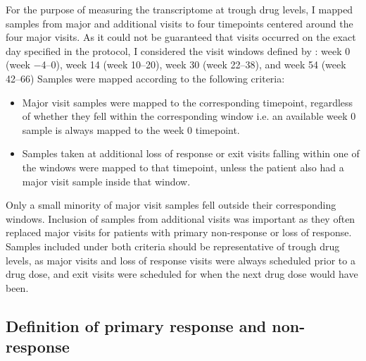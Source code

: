 \begin{outline}
For the purpose of measuring the transcriptome at trough drug levels, I mapped samples from major and additional visits to four timepoints centered around the four major visits.
As it could not be guaranteed that visits occurred on the exact day specified in the protocol, I considered the visit windows defined by \textcite{kennedy2019PredictorsAntiTNFTreatment}: week 0 (week \numrange{-4}{0}), week 14 (week \numrange{10}{20}), week 30 (week \numrange{22}{38}), and week 54 (week \numrange{42}{66})
Samples were mapped according to the following criteria:
\begin{itemize}
    \item Major visit samples were mapped to the corresponding timepoint, regardless of whether they fell within the corresponding window i.e. an available week 0 sample is always mapped to the week 0 timepoint.
    \item Samples taken at additional loss of response or exit visits falling within one of the windows were mapped to that timepoint, unless the patient also had a major visit sample inside that window.
\end{itemize}
Only a small minority of major visit samples fell outside their corresponding windows.
Inclusion of samples from additional visits was important as they often replaced major visits for patients with primary non-response or loss of response.
Samples included under both criteria should be representative of trough drug levels,
as major visits and loss of response visits were always scheduled prior to a drug dose,
and exit visits were scheduled for when the next drug dose would have been.

\subsection{Definition of primary response and non-response}
\label{multiPANTS:PR_definition}


\end{outline}

